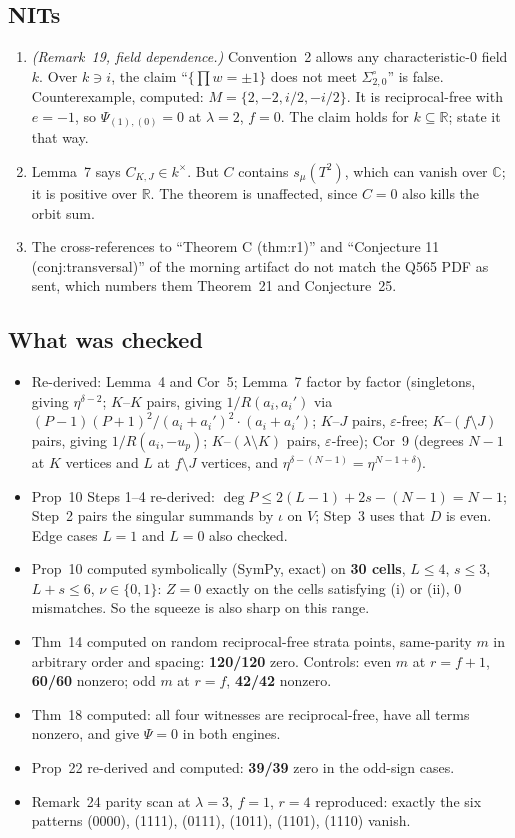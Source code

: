 \documentclass[11pt]{amsart}
\begin{document}
\subsection*{NITs}
\begin{enumerate}[leftmargin=2em]
\item \emph{(Remark~19, field dependence.)} Convention~2 allows any characteristic-0 field $k$.
Over $k\ni i$, the claim ``$\{\prod w=\pm1\}$ does not meet $\Sigma^\circ_{2,0}$'' is false.
Counterexample, computed: $M=\{2,-2,i/2,-i/2\}$. It is reciprocal-free with $e=-1$, so
$\Psi_{(1),(0)}=0$ at $\lambda=2$, $f=0$. The claim holds for $k\subseteq\mathbb R$; state it
that way.
\item Lemma~7 says $C_{K,J}\in k^\times$. But $C$ contains $s_\mu(T^2)$, which can vanish over
$\mathbb C$; it is positive over $\mathbb R$. The theorem is unaffected, since $C=0$ also kills the
orbit sum.
\item The cross-references to ``Theorem C (thm:r1)'' and ``Conjecture 11 (conj:transversal)'' of
the morning artifact do not match the Q565 PDF as sent, which numbers them Theorem~21 and
Conjecture~25.
\end{enumerate}

\subsection*{What was checked}
\begin{itemize}[leftmargin=2em]
\item Re-derived: Lemma~4 and Cor~5; Lemma~7 factor by factor (singletons, giving
$\eta^{\delta-2}$; $K$--$K$ pairs, giving $1/R(a_i,a_i')$ via
$(P-1)(P+1)^2/(a_i+a_i')^2\cdot(a_i+a_i')$; $K$--$J$ pairs, $\varepsilon$-free;
$K$--$(f\setminus J)$ pairs, giving $1/R(a_i,-u_p)$; $K$--$(\lambda\setminus K)$ pairs,
$\varepsilon$-free); Cor~9 (degrees $N-1$ at $K$ vertices and $L$ at $f\setminus J$ vertices,
and $\eta^{\delta-(N-1)}=\eta^{N-1+\delta}$).
\item Prop~10 Steps 1--4 re-derived: $\deg P\le 2(L-1)+2s-(N-1)=N-1$; Step~2 pairs the singular
summands by $\iota$ on $V$; Step~3 uses that $D$ is even. Edge cases $L=1$ and $L=0$ also checked.
\item Prop~10 computed symbolically (SymPy, exact) on \textbf{30 cells}, $L\le4$, $s\le3$,
$L+s\le6$, $\nu\in\{0,1\}$: $Z=0$ exactly on the cells satisfying (i) or (ii), 0 mismatches. So
the squeeze is also sharp on this range.
\item Thm~14 computed on random reciprocal-free strata points, same-parity $m$ in arbitrary order
and spacing: \textbf{120/120} zero. Controls: even $m$ at $r=f+1$, \textbf{60/60} nonzero; odd
$m$ at $r=f$, \textbf{42/42} nonzero.
\item Thm~18 computed: all four witnesses are reciprocal-free, have all terms nonzero, and give
$\Psi=0$ in both engines.
\item Prop~22 re-derived and computed: \textbf{39/39} zero in the odd-sign cases.
\item Remark~24 parity scan at $\lambda=3$, $f=1$, $r=4$ reproduced: exactly the six patterns
(0000), (1111), (0111), (1011), (1101), (1110) vanish.
\end{itemize}
\end{document}
